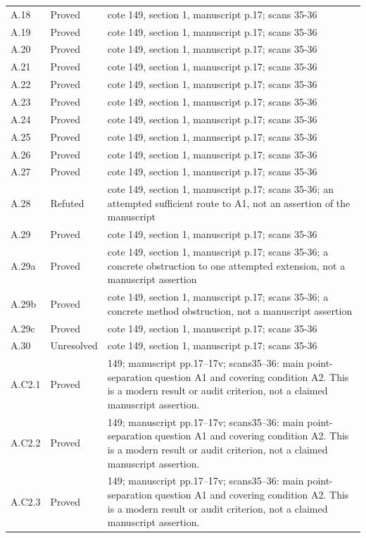{\begin{longtable}{p{1.9cm}p{1.7cm}p{10.3cm}}
A.18 & Proved & cote 149, section 1, manuscript p.17; scans 35-36 \\
A.19 & Proved & cote 149, section 1, manuscript p.17; scans 35-36 \\
A.20 & Proved & cote 149, section 1, manuscript p.17; scans 35-36 \\
A.21 & Proved & cote 149, section 1, manuscript p.17; scans 35-36 \\
A.22 & Proved & cote 149, section 1, manuscript p.17; scans 35-36 \\
A.23 & Proved & cote 149, section 1, manuscript p.17; scans 35-36 \\
A.24 & Proved & cote 149, section 1, manuscript p.17; scans 35-36 \\
A.25 & Proved & cote 149, section 1, manuscript p.17; scans 35-36 \\
A.26 & Proved & cote 149, section 1, manuscript p.17; scans 35-36 \\
A.27 & Proved & cote 149, section 1, manuscript p.17; scans 35-36 \\
A.28 & Refuted & cote 149, section 1, manuscript p.17; scans 35-36; an attempted sufficient route to A1, not an assertion of the manuscript \\
A.29 & Proved & cote 149, section 1, manuscript p.17; scans 35-36 \\
A.29a & Proved & cote 149, section 1, manuscript p.17; scans 35-36; a concrete obstruction to one attempted extension, not a manuscript assertion \\
A.29b & Proved & cote 149, section 1, manuscript p.17; scans 35-36; a concrete method obstruction, not a manuscript assertion \\
A.29c & Proved & cote 149, section 1, manuscript p.17; scans 35-36 \\
A.30 & Unresolved & cote 149, section 1, manuscript p.17; scans 35-36 \\
A.C2.1 & Proved & 149; manuscript pp.17–17v; scans35–36: main point-separation question A1 and covering condition A2. This is a modern result or audit criterion, not a claimed manuscript assertion. \\
A.C2.2 & Proved & 149; manuscript pp.17–17v; scans35–36: main point-separation question A1 and covering condition A2. This is a modern result or audit criterion, not a claimed manuscript assertion. \\
A.C2.3 & Proved & 149; manuscript pp.17–17v; scans35–36: main point-separation question A1 and covering condition A2. This is a modern result or audit criterion, not a claimed manuscript assertion. \\

\end{longtable}}
